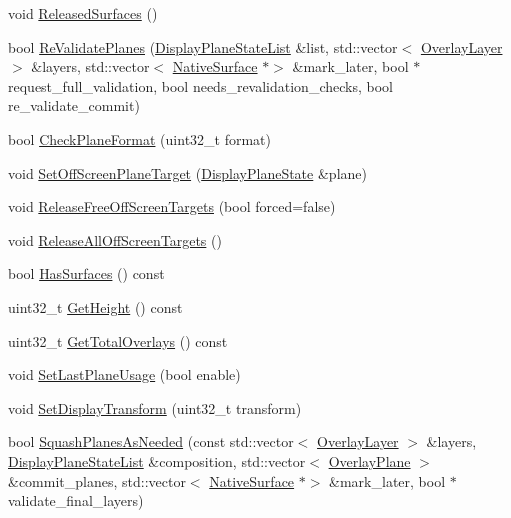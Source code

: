 \begin{DoxyCompactItemize}
\item 
void \mbox{\hyperlink{classhwcomposer_1_1DisplayPlaneManager_a027bc17f4b4b7f61056ba93616e5787f}{Released\+Surfaces}} ()
\item 
bool \mbox{\hyperlink{classhwcomposer_1_1DisplayPlaneManager_a2d428d923d493cfca4b14e9a0ea5b952}{Re\+Validate\+Planes}} (\mbox{\hyperlink{namespacehwcomposer_adf383ae435d39a5631a8ad82e7fa18a4}{Display\+Plane\+State\+List}} \&list, std\+::vector$<$ \mbox{\hyperlink{structhwcomposer_1_1OverlayLayer}{Overlay\+Layer}} $>$ \&layers, std\+::vector$<$ \mbox{\hyperlink{classhwcomposer_1_1NativeSurface}{Native\+Surface}} $\ast$$>$ \&mark\+\_\+later, bool $\ast$request\+\_\+full\+\_\+validation, bool needs\+\_\+revalidation\+\_\+checks, bool re\+\_\+validate\+\_\+commit)
\item 
bool \mbox{\hyperlink{classhwcomposer_1_1DisplayPlaneManager_ac5fa79927587781837c103df3aa8fb3d}{Check\+Plane\+Format}} (uint32\+\_\+t format)
\item 
void \mbox{\hyperlink{classhwcomposer_1_1DisplayPlaneManager_af76e9e632a76792f65bcde3a9e025169}{Set\+Off\+Screen\+Plane\+Target}} (\mbox{\hyperlink{classhwcomposer_1_1DisplayPlaneState}{Display\+Plane\+State}} \&plane)
\item 
void \mbox{\hyperlink{classhwcomposer_1_1DisplayPlaneManager_a953f9760e8a6a692213c32e66928d527}{Release\+Free\+Off\+Screen\+Targets}} (bool forced=false)
\item 
void \mbox{\hyperlink{classhwcomposer_1_1DisplayPlaneManager_aaafa069e84d1ae52f0f7dd8c973e5620}{Release\+All\+Off\+Screen\+Targets}} ()
\item 
bool \mbox{\hyperlink{classhwcomposer_1_1DisplayPlaneManager_a5d6b465f2867254778f611f2afddb0af}{Has\+Surfaces}} () const
\item 
uint32\+\_\+t \mbox{\hyperlink{classhwcomposer_1_1DisplayPlaneManager_abfa5fe391e308c60cea394a131d87d35}{Get\+Height}} () const
\item 
uint32\+\_\+t \mbox{\hyperlink{classhwcomposer_1_1DisplayPlaneManager_a8a2bbba4ec1dea9578e8f6103a636e24}{Get\+Total\+Overlays}} () const
\item 
void \mbox{\hyperlink{classhwcomposer_1_1DisplayPlaneManager_ac9eeb5875537f8ca624760e04bead0fd}{Set\+Last\+Plane\+Usage}} (bool enable)
\item 
void \mbox{\hyperlink{classhwcomposer_1_1DisplayPlaneManager_a80527bbdb1b4f5c9fe8a58241e27f559}{Set\+Display\+Transform}} (uint32\+\_\+t transform)
\item 
bool \mbox{\hyperlink{classhwcomposer_1_1DisplayPlaneManager_ada91a47d462537740543db7c70d07f8e}{Squash\+Planes\+As\+Needed}} (const std\+::vector$<$ \mbox{\hyperlink{structhwcomposer_1_1OverlayLayer}{Overlay\+Layer}} $>$ \&layers, \mbox{\hyperlink{namespacehwcomposer_adf383ae435d39a5631a8ad82e7fa18a4}{Display\+Plane\+State\+List}} \&composition, std\+::vector$<$ \mbox{\hyperlink{structhwcomposer_1_1OverlayPlane}{Overlay\+Plane}} $>$ \&commit\+\_\+planes, std\+::vector$<$ \mbox{\hyperlink{classhwcomposer_1_1NativeSurface}{Native\+Surface}} $\ast$$>$ \&mark\+\_\+later, bool $\ast$validate\+\_\+final\+\_\+layers)

\end{DoxyCompactItemize}
